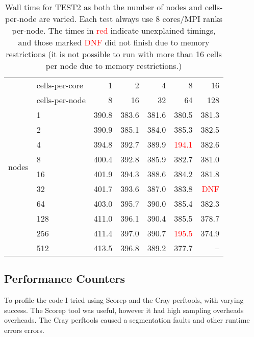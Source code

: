 \begin{table}[htp!]
    \centering
\begin{tabular}{l|l|rrrrr}
\multirow{2}{*}{}
& cells-per-core  &    1  & 2     & 4     & 8  & 16  \\
& cells-per-node  &    8  & 16    & 32    & 64 & 128 \\
\hline
\multirow{8}{*}{nodes}
&1                & 390.8 & 383.6 & 381.6 & 380.5 & 381.3\\
&2                & 390.9 & 385.1 & 384.0 & 385.3 & 382.5\\
&4                & 394.8 & 392.7 & 389.9 & \textcolor{red}{194.1} & 382.6\\
&8                & 400.4 & 392.8 & 385.9 & 382.7 & 381.0\\
&16               & 401.9 & 394.3 & 388.6 & 384.2 & 381.8\\
&32               & 401.7 & 393.6 & 387.0 & 383.8 & \textcolor{red}{DNF}\\
&64               & 403.0 & 395.7 & 390.0 & 385.4 & 382.3 \\
&128              & 411.0 & 396.1 & 390.4 & 385.5 & 378.7 \\
&256              & 411.4 & 397.0 & 390.7 & \textcolor{red}{195.5} & 374.9\\
&512              & 413.5 & 396.8 & 389.2 & 377.7 & --\\
\end{tabular}

\label{tbl:test2scaling}
\caption{Wall time for TEST2 as both the number of nodes and cells-per-node are varied. Each test always use 8 cores/MPI ranks per-node. The times in \textcolor{red}{red} indicate unexplained timings, and those marked \textcolor{red}{DNF} did not finish due to memory restrictions (it is not possible to run with more than 16 cells per node due to memory restrictions.)}
\end{table}

\subsection{Performance Counters}
To profile the code I tried using Scorep and the Cray perftools, with varying success. The Scorep tool was useful, however it had high sampling overheads overheads. The Cray perftools caused a segmentation faults and other runtime errors errors.

